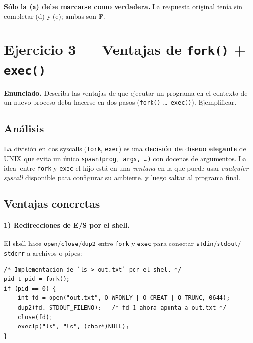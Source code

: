 \documentclass[11pt,a4paper]{article}
\begin{document}
\begin{importante}
\textbf{Sólo la (a) debe marcarse como verdadera.} La respuesta
original tenía sin completar (d) y (e); ambas son \textbf{F}.
\end{importante}

\section{Ejercicio 3 --- Ventajas de \texttt{fork()} + \texttt{exec()}}

\textbf{Enunciado.} Describa las ventajas de que ejecutar un programa
en el contexto de un nuevo proceso deba hacerse en dos pasos
(\texttt{fork()} \ldots\ \texttt{exec()}). Ejemplificar.

\subsection*{Análisis}

La división en dos syscalls (\texttt{fork}, \texttt{exec}) es una
\textbf{decisión de diseño elegante} de UNIX que evita un único
\texttt{spawn(prog, args, \ldots)} con docenas de argumentos. La
idea: entre \texttt{fork} y \texttt{exec} el hijo está en una
\emph{ventana} en la que puede usar \emph{cualquier syscall}
disponible para configurar su ambiente, y luego saltar al programa
final.

\subsection*{Ventajas concretas}

\paragraph{1) Redirecciones de E/S por el shell.}
El shell hace \texttt{open}/\texttt{close}/\texttt{dup2} entre
\texttt{fork} y \texttt{exec} para conectar \texttt{stdin}/\texttt{stdout}/
\texttt{stderr} a archivos o pipes:

\begin{lstlisting}[style=cstyle]
/* Implementacion de `ls > out.txt` por el shell */
pid_t pid = fork();
if (pid == 0) {
    int fd = open("out.txt", O_WRONLY | O_CREAT | O_TRUNC, 0644);
    dup2(fd, STDOUT_FILENO);   /* fd 1 ahora apunta a out.txt */
    close(fd);
    execlp("ls", "ls", (char*)NULL);
}
\end{lstlisting}
\end{document}
